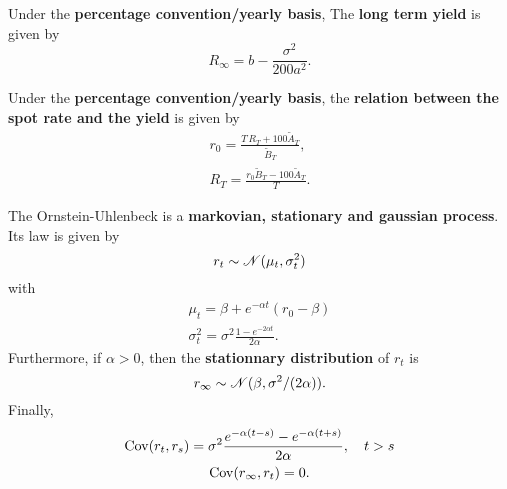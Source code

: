 \begin{outline}
  \1 Under the \textbf{percentage convention/yearly basis}, The \textbf{long term yield}
  is given by
  \begin{equation*}
    R_\infty = b - \frac{\sigma^2}{200a^2}.
  \end{equation*}

  \1 Under the \textbf{percentage convention/yearly basis}, the \textbf{relation between
    the spot rate and the yield} is given by
  \begin{gather*}
    r_0 = \frac{T\,R_T + 100 \tilde A_T}{\tilde B_T},\\
    R_T = \frac{r_0\tilde B_T - 100\tilde A_T}{T}.
  \end{gather*}
  
  \1 The Ornstein-Uhlenbeck is a \textbf{markovian, stationary and gaussian process}. Its
  law is given by
  \begin{equation*}
    r_t \sim \mathscr{N}(\mu_t,\sigma^2_t)
  \end{equation*}
  with
  \begin{gather*}
    \mu_t = \beta + e^{-\alpha t}(r_0 - \beta)\\
    \sigma^2_t = \sigma^2\frac{1-e^{-2\alpha t}}{2\alpha}.
  \end{gather*}
  Furthermore, if $\alpha>0$, then the \textbf{stationnary distribution} of $r_t$ is
  \begin{equation*}
    r_\infty \sim \mathscr{N}(\beta,\sigma^2/(2\alpha)).
  \end{equation*}
  Finally, 
  \begin{gather*}
    \operatorname{Cov}(r_t,r_s) = \sigma^2\frac{e^{-\alpha(t-s)}-e^{-\alpha(t+s)}}{2\alpha},\quad t>s\\
    \operatorname{Cov}(r_\infty,r_t) = 0.
  \end{gather*}
\end{outline}


